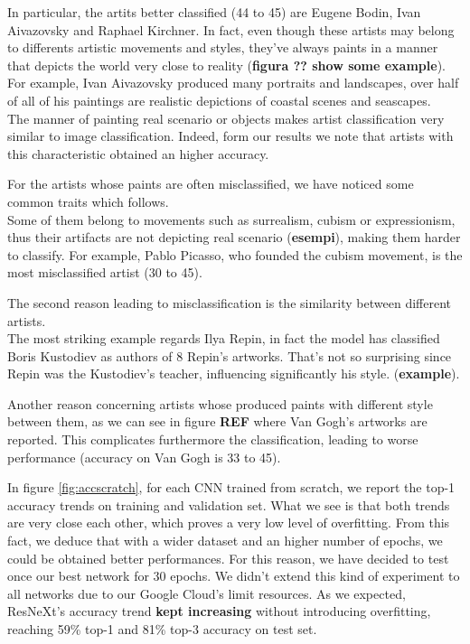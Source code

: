 \documentclass{article}
\begin{document}
In particular, the artits better classified (44 to 45) are Eugene Bodin, Ivan Aivazovsky and Raphael Kirchner. In fact, even though these artists may belong to differents artistic movements and styles, they've always paints in a manner that depicts the world very close to reality (\textbf{figura ?? show some example}).\\
For example, Ivan Aivazovsky produced many portraits and landscapes, over half of all of his paintings are realistic depictions of coastal scenes and seascapes. \\
The manner of painting real scenario or objects makes artist classification very similar to image classification. Indeed, form our results we note that artists with this characteristic obtained an higher accuracy.

For the artists whose paints are often misclassified, we have noticed some common traits which follows.\\
Some of them belong to movements such as surrealism, cubism or expressionism, thus their artifacts are not depicting real scenario (\textbf{esempi}), making them harder to classify.
For example, Pablo Picasso, who founded the cubism movement, is the most misclassified artist (30 to 45).
  
The second reason leading to misclassification is the similarity  between different artists.\\
The most striking example regards Ilya Repin, in fact the model has classified Boris Kustodiev as authors of 8 Repin's artworks. That's not so surprising since Repin was the Kustodiev's teacher, influencing significantly his style. (\textbf{example}).

Another reason concerning artists whose produced paints with different style between them, as we can see in figure \textbf{REF} where Van Gogh's artworks are reported. This complicates furthermore the classification, leading to worse performance (accuracy on Van Gogh is 33 to 45).

In figure \ref{fig:accscratch}, for each CNN trained from scratch,  we report the top-1 accuracy trends on training and validation set. What we see is that both trends are very close each other, which proves a very low level of overfitting.
From this fact, we deduce that with a wider dataset and an higher number of epochs, we could be obtained better performances. For this reason, we have decided to test once our best network for 30 epochs. We didn't extend this kind of experiment to all networks due to our Google Cloud's limit resources. As we expected, ResNeXt's accuracy trend \textbf{kept increasing } without introducing overfitting, reaching 59\% top-1 and 81\% top-3 accuracy on test set.
\end{document}
